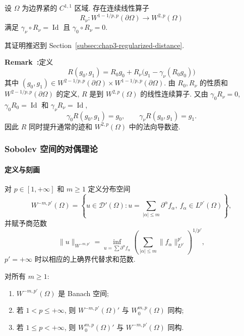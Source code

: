 \begin{Theorem}
\label{thm:chap3-normal-trace-lifting}
设 $\Omega$ 为边界紧的 $C^{1,1}$ 区域. 存在连续线性算子
\[
 R_\nu:W^{1-1/p,p}(\partial\Omega)\longrightarrow W^{2,p}(\Omega)
\]
满足 $\gamma_\nu\circ R_\nu=\operatorname{Id}$ 且 $\gamma_0\circ R_\nu=0$.
\end{Theorem}

其证明推迟到 Section~\ref{subsec:chap3-regularized-distance}.

\par\noindent{}\textbf{Remark~\thechapterthreesectiontworemark:}\label{rem:chap3-normal-lifting-decomposition}\quad 定义
\[
 R(g_0,g_1)=R_0g_0+R_\nu\bigl(g_1-\gamma_\nu(R_0g_0)\bigr)
\]
其中 $(g_0,g_1)\in W^{2-1/p,p}(\partial\Omega)\times W^{1-1/p,p}(\partial\Omega)$. 由 $R_0,R_\nu$ 的性质和 $W^{2-1/p,p}(\partial\Omega)$ 的定义, $R$ 是到 $W^{2,p}(\Omega)$ 的线性连续算子. 又由 $\gamma_0R_\nu=0$, $\gamma_0R_0=\operatorname{Id}$ 和 $\gamma_\nu R_\nu=\operatorname{Id}$,
\[
 \gamma_0R(g_0,g_1)=g_0,
 \qquad \gamma_\nu R(g_0,g_1)=g_1.
\]
因此 $R$ 同时提升通常的迹和 $W^{2,p}(\Omega)$ 中的法向导数迹.

\subsubsection{Sobolev 空间的对偶理论}
\label{subsec:chap3-sobolev-duality}

\paragraph{定义与刻画}

对 $p\in[1,+\infty]$ 和 $m\geq1$ 定义分布空间
\begin{equation}
 W^{-m,p'}(\Omega)=\left\{u\in\mathcal D'(\Omega):
 u=\sum_{|\alpha|\leq m}\partial^\alpha f_\alpha,
 \ f_\alpha\in L^{p'}(\Omega)\right\},
 \label{eq:chap3-negative-sobolev-definition}
\end{equation}
并赋予商范数
\begin{equation}
 \|u\|_{W^{-m,p'}}=
 \inf_{u=\sum\partial^\alpha f_\alpha}
 \left(\sum_{|\alpha|\leq m}\|f_\alpha\|_{L^{p'}}^{p'}\right)^{1/p'},
 \label{eq:chap3-negative-sobolev-norm}
\end{equation}
$p'=+\infty$ 时以相应的上确界代替求和范数.

\begin{Theorem}
\label{thm:chap3-negative-sobolev-duality}
对所有 $m\geq1$:
\begin{enumerate}
\item $W^{-m,p'}(\Omega)$ 是 Banach 空间;
\item 若 $1<p\leq+\infty$, 则 $W^{-m,p'}(\Omega)'$ 与 $W_0^{m,p}(\Omega)$ 同构;
\item 若 $1\leq p<+\infty$, 则 $W_0^{m,p}(\Omega)'$ 与 $W^{-m,p'}(\Omega)$ 同构.
\end{enumerate}
\end{Theorem}

